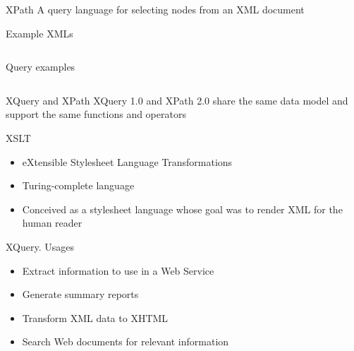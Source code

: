 \documentclass[sans]{beamer}
\begin{document}
\begin{frame}{XPath}
	A query language for selecting nodes from an XML document
	\begin{block}{Example XMLs}
		\inputminted[fontsize=\tiny]{xml}{codes/ex24.xml}
	\end{block}
	\begin{block}{Query examples}
		\inputminted[fontsize=\tiny]{xquery}{codes/ex25.xml}
	\end{block}
\end{frame}

\begin{frame}{XQuery and XPath}
	XQuery 1.0 and XPath 2.0 share the same data model and support the same functions and operators

\end{frame}




\begin{frame}{XSLT}
	\begin{itemize}
		\item eXtensible Stylesheet Language Transformations
		\item Turing-complete language
		\item Conceived as a stylesheet language whose goal was to render XML for the human reader
	\end{itemize}
\end{frame}


\begin{frame}{XQuery. Usages}
	\begin{itemize}
		\item Extract information to use in a Web Service
		\item Generate summary reports
		\item Transform XML data to XHTML
		\item Search Web documents for relevant information
	\end{itemize}
\end{frame}
\end{document}
